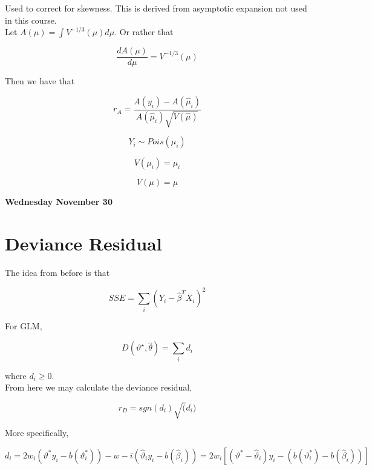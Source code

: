 \documentclass[11pt,fleqn]{book} %
\begin{document}
Used to correct for skewness. This is derived from asymptotic expansion not used in this course. \\

Let $A(\mu) = \int V^{-1/3}(\mu) d\mu$. Or rather that

		$$\frac{d A(\mu)}{d \mu} = V^{-1/3}(\mu) $$


Then we have that 

		$$r_A = \frac{A(y_i) - A(\hat{\mu}_i)}{A(\hat{\mu}_i) \sqrt{V(\hat{\mu})}} $$



\begin{example}
	$$Y_i \sim Pois(\mu_i) $$

	$$V(\mu_i) = \mu_i $$

	$$V(\mu) = \mu$$




\end{example}

\textbf{Wednesday November 30}\\

\section{Deviance Residual}


The idea from before is that 
		
		$$SSE = \sum_i (Y_i - \hat{\beta}^T X_i)^2 $$

For GLM, 

		$$D(\vartheta^\star, \hat{\theta}) = \sum_i d_i $$

where $d_i \geq 0$.\\

From here we may calculate the deviance residual, 

		$$r_D = sgn(d_i) \sqrt(d_i) $$

More specifically, 

		$$d_i = 2 w_i (\vartheta^* y_i - b(\vartheta^*_i)) - w-i (\hat{\vartheta}_i y_i - b(\hat{\beta}_i)) = 2 w_i [(\vartheta^* - \hat{\vartheta}_i) y_i - (b(\vartheta^*_i) - b(\hat{\beta}_i))] $$
\end{document}
